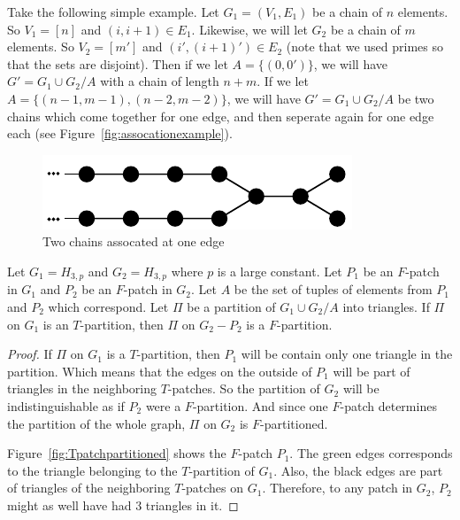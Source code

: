 \documentclass[runningheads,a4paper]{llncs}
\begin{document}
Take the following simple example. Let $G_1 = (V_1, E_1)$ be a chain of $n$ elements. So $V_1 = [n]$ and $(i, i+1) \in E_1$. Likewise, we will let $G_2$ be a chain of $m$ elements. So $V_2 = [m']$ and $(i', (i+1)')\in E_2$ (note that we used primes so that the sets are disjoint). Then if we let $A = \{ (0, 0') \}$, we will have $G' = G_1 \cup G_2 / A$ with a chain of length $n+m$. If we let $A = \{ (n-1, m-1), (n-2, m-2) \}$, we will have $G' = G_1 \cup G_2 / A$ be two chains which come together for one edge, and then seperate again for one edge each (see Figure~\ref{fig:assocationexample}).

\begin{figure}[ht]
\label{fig:associationexample}
\centering
\includegraphics[width=0.5\linewidth]{associationchainexample.pdf}
\caption{Two chains assocated at one edge}
\end{figure} 

\begin{lemma}
\label{lem:varF}
Let $G_1 = H_{3, p}$ and $G_2 = H_{3, p}$ where $p$ is a large constant. Let $P_1$ be an $F$-patch in $G_1$ and $P_2$ be an $F$-patch in $G_2$. Let $A$ be the set of tuples of elements from $P_1$ and $P_2$ which correspond. Let $\Pi$ be a partition of $G_1 \cup G_2 / A$ into triangles. If $\Pi$ on $G_1$ is an $T$-partition, then $\Pi$ on $G_2 - P_2$ is a $F$-partition.
\end{lemma}

\begin{proof}
If $\Pi$ on $G_1$ is a $T$-partition, then $P_1$ will be contain only one triangle in the partition. Which means that the edges on the outside of $P_1$ will be part of triangles in the neighboring $T$-patches. So the partition of $G_2$ will be indistinguishable as if $P_2$ were a $F$-partition. And since one $F$-patch determines the partition of the whole graph, $\Pi$ on $G_2$ is $F$-partitioned.  

Figure~\ref{fig:Tpatchpartitioned} shows the $F$-patch $P_1$. The green edges corresponds to the triangle belonging to the $T$-partition of $G_1$. Also, the black edges are part of triangles of the neighboring $T$-patches on $G_1$. Therefore, to any patch in $G_2$, $P_2$ might as well have had $3$ triangles in it.
\end{proof}
\end{document}
